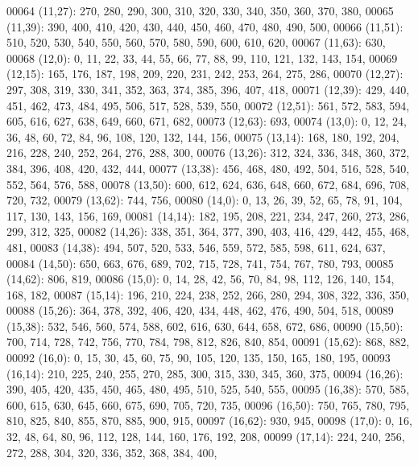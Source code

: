 \begin{DoxyCode}
00064       (11,27): 270, 280, 290, 300, 310, 320, 330, 340, 350, 360, 370, 380,
00065       (11,39): 390, 400, 410, 420, 430, 440, 450, 460, 470, 480, 490, 500,
00066       (11,51): 510, 520, 530, 540, 550, 560, 570, 580, 590, 600, 610, 620,
00067       (11,63): 630,
00068       (12,0): 0, 11, 22, 33, 44, 55, 66, 77, 88, 99, 110, 121, 132, 143, 154,
00069       (12,15): 165, 176, 187, 198, 209, 220, 231, 242, 253, 264, 275, 286,
00070       (12,27): 297, 308, 319, 330, 341, 352, 363, 374, 385, 396, 407, 418,
00071       (12,39): 429, 440, 451, 462, 473, 484, 495, 506, 517, 528, 539, 550,
00072       (12,51): 561, 572, 583, 594, 605, 616, 627, 638, 649, 660, 671, 682,
00073       (12,63): 693,
00074       (13,0): 0, 12, 24, 36, 48, 60, 72, 84, 96, 108, 120, 132, 144, 156,
00075       (13,14): 168, 180, 192, 204, 216, 228, 240, 252, 264, 276, 288, 300,
00076       (13,26): 312, 324, 336, 348, 360, 372, 384, 396, 408, 420, 432, 444,
00077       (13,38): 456, 468, 480, 492, 504, 516, 528, 540, 552, 564, 576, 588,
00078       (13,50): 600, 612, 624, 636, 648, 660, 672, 684, 696, 708, 720, 732,
00079       (13,62): 744, 756,
00080       (14,0): 0, 13, 26, 39, 52, 65, 78, 91, 104, 117, 130, 143, 156, 169,
00081       (14,14): 182, 195, 208, 221, 234, 247, 260, 273, 286, 299, 312, 325,
00082       (14,26): 338, 351, 364, 377, 390, 403, 416, 429, 442, 455, 468, 481,
00083       (14,38): 494, 507, 520, 533, 546, 559, 572, 585, 598, 611, 624, 637,
00084       (14,50): 650, 663, 676, 689, 702, 715, 728, 741, 754, 767, 780, 793,
00085       (14,62): 806, 819,
00086       (15,0): 0, 14, 28, 42, 56, 70, 84, 98, 112, 126, 140, 154, 168, 182,
00087       (15,14): 196, 210, 224, 238, 252, 266, 280, 294, 308, 322, 336, 350,
00088       (15,26): 364, 378, 392, 406, 420, 434, 448, 462, 476, 490, 504, 518,
00089       (15,38): 532, 546, 560, 574, 588, 602, 616, 630, 644, 658, 672, 686,
00090       (15,50): 700, 714, 728, 742, 756, 770, 784, 798, 812, 826, 840, 854,
00091       (15,62): 868, 882,
00092       (16,0): 0, 15, 30, 45, 60, 75, 90, 105, 120, 135, 150, 165, 180, 195,
00093       (16,14): 210, 225, 240, 255, 270, 285, 300, 315, 330, 345, 360, 375,
00094       (16,26): 390, 405, 420, 435, 450, 465, 480, 495, 510, 525, 540, 555,
00095       (16,38): 570, 585, 600, 615, 630, 645, 660, 675, 690, 705, 720, 735,
00096       (16,50): 750, 765, 780, 795, 810, 825, 840, 855, 870, 885, 900, 915,
00097       (16,62): 930, 945,
00098       (17,0): 0, 16, 32, 48, 64, 80, 96, 112, 128, 144, 160, 176, 192, 208,
00099       (17,14): 224, 240, 256, 272, 288, 304, 320, 336, 352, 368, 384, 400,

\end{DoxyCode}
